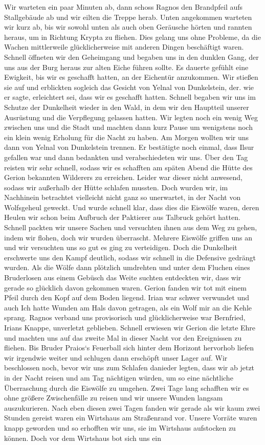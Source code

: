 Wir warteten ein paar Minuten ab, dann schoss Ragnos den Brandpfeil aufs Stallgebäude ab und wir eilten die Treppe herab. Unten angekommen warteten wir kurz ab, bis wir sowohl unten als auch oben Geräusche hörten und rannten heraus, um in Richtung Krypta zu fliehen. Dies gelang uns ohne Probleme, da die Wachen mittlerweile glücklicherweise mit anderen Dingen beschäftigt waren. Schnell öffneten wir den Geheimgang und begaben uns in den dunklen Gang, der uns aus der Burg heraus zur alten Eiche führen sollte. Es dauerte gefühlt eine Ewigkeit, bis wir es geschafft hatten, an der Eichentür anzukommen. Wir stießen sie auf und erblickten sogleich das Gesicht von Yelnal von Dunkelstein, der. wie er sagte, erleichtert sei, dass wir es geschafft hatten. Schnell begaben wir uns im Schutze der Dunkelheit wieder in den Wald, in dem wir den Hauptteil unserer Ausrüstung und die Verpflegung gelassen hatten. Wir legten noch ein wenig Weg zwischen uns und die Stadt und machten dann kurz Pause um wenigstens noch ein klein wenig Erholung für die Nacht zu haben. Am Morgen wollten wir uns dann von Yelnal von Dunkelstein trennen. Er bestätigte noch einmal, dass Ilsur gefallen war und dann bedankten und verabschiedeten wir uns. Über den Tag reisten wir sehr schnell, sodass wir es schafften am späten Abend die Hütte des Gerion bekannten Wilderers zu erreichen. Leider war dieser nicht anwesend, sodass wir außerhalb der Hütte schlafen mussten. Doch wurden wir, im Nachhinein betrachtet vielleicht nicht ganz so unerwartet, in der Nacht von Wolfsgeheul geweckt. Und wurde schnell klar, dass dies die Eiswölfe waren, deren Heulen wir schon beim Aufbruch der Paktierer aus Talbruck gehört hatten. Schnell packten wir unsere Sachen und versuchten ihnen aus dem Weg zu gehen, indem wir flohen, doch wir wurden überrascht. Mehrere Eiswölfe griffen uns an und wir versuchten uns so gut es ging zu verteidigen. Doch die Dunkelheit erschwerte uns den Kampf deutlich, sodass wir schnell in die Defensive gedrängt wurden. Als die Wölfe dann plötzlich umdrehten und unter dem Fluchen eines Bruderlosen aus einem Gebüsch das Weite suchten entdeckten wir, dass wir gerade so glücklich davon gekommen waren. Gerion fanden wir tot mit einem Pfeil durch den Kopf auf dem Boden liegend. Irian war schwer verwundet und auch Ich hatte Wunden am Hals davon getragen, als ein Wolf mir an die Kehle sprang. Ragnos verband uns provisorisch und glücklicherweise war Bernfried, Irians Knappe, unverletzt geblieben. Schnell erwiesen wir Gerion die letzte Ehre und machten uns auf das zweite Mal in dieser Nacht vor den Ereignissen zu fliehen. Bis Bruder Praios`s Feuerball sich hinter dem Horizont hervorhob liefen wir irgendwie weiter und schlugen dann erschöpft unser Lager auf. Wir beschlossen noch, bevor wir uns zum Schlafen danieder legten, dass wir ab jetzt in der Nacht reisen und am Tag nächtigen würden, um so eine nächtliche Überraschung durch die Eiswölfe zu umgehen. Zwei Tage lang schafften wir es ohne größere Zwischenfälle zu reisen und wir unsere Wunden langsam auszukurieren. Nach eben diesen zwei Tagen fanden wir gerade als wir kaum zwei Stunden gereist waren ein Wirtshaus am Straßenrand vor. Unsere Vorräte waren knapp geworden und so erhofften wir uns, sie im Wirtshaus aufstocken zu können. Doch vor dem Wirtshaus bot sich uns ein 